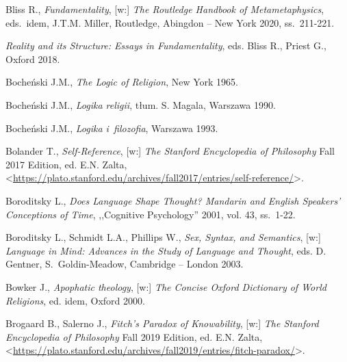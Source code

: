 \begin{thebibliography}{100}
Bliss R., \textit{Fundamentality}, [w:] \textit{The Routledge Handbook of Metametaphysics}, eds.~idem, J.T.M. Miller, Routledge, Abingdon -- New York 2020, ss.~211-221.

\textit{Reality and its Structure: Essays in Fundamentality}, eds. Bliss R., Priest G.,  Oxford 2018.

Bocheński J.M., \textit{The Logic of Religion}, New York 1965.

Bocheński J.M., \textit{Logika religii}, tłum. S. Magala, Warszawa 1990.

Bocheński J.M., \textit{Logika i~filozofia}, Warszawa 1993.


Bolander T., \textit{Self-Reference}, [w:] \textit{The Stanford Encyclopedia of Philosophy}
Fall 2017 Edition, ed. E.N. Zalta, {\textless}\url{https://plato.stanford.edu/archives/fall2017/entries/self-reference/}{\textgreater}.

Boroditsky L., \textit{Does Language Shape Thought? Mandarin and English Speakers' Conceptions of Time}, ,,Cognitive Psychology'' 2001, vol. 43, ss.~1-22.

Boroditsky L., Schmidt L.A., Phillips W., \textit{Sex, Syntax, and Semantics},
[w:] \textit{Language in Mind: Advances in the Study of Language and Thought}, eds. D. Gentner, S.~Goldin-Meadow, Cambridge -- London 2003.

Bowker J., \textit{Apophatic theology}, [w:] \textit{The Concise Oxford Dictionary of World Religions}, ed. idem, Oxford 2000.


Brogaard B., Salerno J., \textit{Fitch's Paradox of Knowability}, [w:] \textit{The Stanford Encyclopedia of Philosophy}
Fall 2019 Edition, ed. E.N. Zalta, <\url{https://plato.stanford.edu/archives/fall2019/entries/fitch-paradox/}>.


\end{thebibliography}
